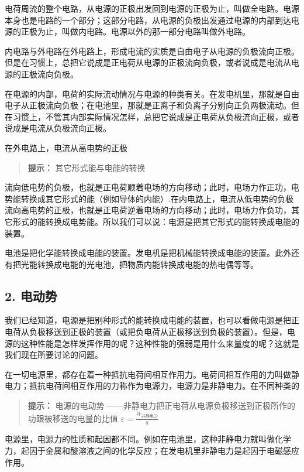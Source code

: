 电荷周流的整个电路，从电源的正极出发回到电源的正极为止，叫做全电路。电源本身也是电路的一个部分；这部分电路，从电源的负极出发通过电源的内部到达电源的正极为止，叫做内电路。电源以外的那一部分电路叫做外电路。

内电路与外电路在外电路上，形成电流的实质是自由电子从电源的负极流向正极。但是在习惯上，总把它说成是正电荷从电源的正极流向负极，或者说成是电流从电源的正极流向负极。

在电源的内部，电荷的实际流动情况与电源的种类有关。在发电机里，那就是自由电子从正极流向负极；在电池里，那就是正离子和负离子分别向正负两极流动。但在习惯上，不管其内部实际情况怎样，总把它说成是正电荷从负极流向正极，或者说成是电流从负极流向正极。

在外电路上，电流从高电势的正极

\begin{quote}
\textbf{提示：} 其它形式能与电能的转换
\end{quote}

流向低电势的负极，也就是正电荷顺着电场的方向移动；此时，电场力作正功，电势能转换成其它形式的能（例如导体的内能）.在内电路上，电流从低电势的负极流向高电势的正极，也就是正电荷逆着电场的方向移动；此时，电场力作负功，其它形式的能转换成电势能。所以我们可以说：电源是把其它形式的能转换成电能的装置。

电池是把化学能转换成电能的装置。发电机是把机械能转换成电能的装置。此外还有把光能转换成电能的光电池，把物质内能转换成电能的热电偶等等。

\subsection{2. 电动势}\label{ux7535ux52a8ux52bf}

我们已经知道，电源是把别种形式的能转换成电能的装置，也可以看做电源是把正电荷从负极移送到正极的装置（或把负电荷从正极移送到负极的装置）。但是，电源的这种性能是怎样发挥作用的呢？这种性能的强弱是用什么来量度的呢？这就是我们现在所要讨论的问题。

在一切电源里，都存在着一种抵抗电荷间相互作用力。电荷间相互作用的力叫做静电力；抵抗电荷间相互作用的力称作为电源力，电源力是非静电力。在不同种类的

\begin{quote}
\textbf{提示：} 电源的电动势
------非静电力把正电荷从电源负极移送到正极所作的功跟被移送的电量的比值
\(\varepsilon = \frac{W_{\text{非静电力}}}{q}\)
\end{quote}

电源里，电源力的性质和起因都不同。例如在电池里，这种非静电力就叫做化学力，起因于金属和酸溶液之间的化学反应；在发电机里非静电力是起因于电磁感应作用。

